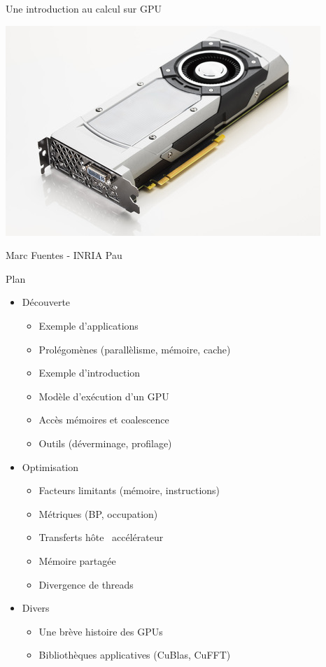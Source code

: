 \documentclass[11pt,mathserif]{beamer}
\newcommand{\geziBikoitz}{\faArrowsH}
\begin{document}
\begin{frame}
\begin{center}
  {\Large Une introduction au calcul sur GPU} 
\end{center}
\begin{center}
\includegraphics[width=0.5\linewidth]{fig/gpu.jpg}
\end{center}
\begin{center}
{\large Marc Fuentes - INRIA Pau\\ }
\end{center}
\end{frame}

\begin{frame}{Plan}
\begin{itemize}[<+->]
   \item Découverte
     \begin{itemize}
       \item Exemple d'applications 
       \item Prolégomènes (parallèlisme, mémoire, cache)
       \item Exemple d'introduction
       \item Modèle d'exécution d'un GPU
       \item Accès mémoires et coalescence
       \item Outils (déverminage, profilage)
     \end{itemize}
 \item Optimisation 
     \begin{itemize}
       \item Facteurs limitants (mémoire, instructions)
       \item Métriques (BP, occupation)
       \item Transferts hôte \geziBikoitz\ accélérateur
       \item Mémoire partagée
       \item Divergence de threads
     \end{itemize}
  \item Divers
     \begin{itemize}
       \item Une brève histoire des GPUs
       \item Bibliothèques applicatives (CuBlas, CuFFT)
     \end{itemize}
\end{itemize}
\end{frame}
\end{document}
